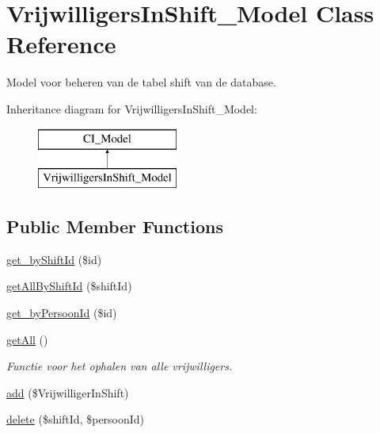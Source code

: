 \hypertarget{class_vrijwilligers_in_shift___model}{}\section{Vrijwilligers\+In\+Shift\+\_\+\+Model Class Reference}
\label{class_vrijwilligers_in_shift___model}


Model voor beheren van de tabel shift van de database.  


Inheritance diagram for Vrijwilligers\+In\+Shift\+\_\+\+Model\+:\begin{figure}[H]
\begin{center}
\leavevmode
\includegraphics[height=2.000000cm]{class_vrijwilligers_in_shift___model}
\end{center}
\end{figure}
\subsection*{Public Member Functions}
\begin{DoxyCompactItemize}
\item 
\mbox{\hyperlink{class_vrijwilligers_in_shift___model_ac7afbe51273364c55dd352b3c9554592}{get\+\_\+by\+Shift\+Id}} (\$id)
\item 
\mbox{\hyperlink{class_vrijwilligers_in_shift___model_a8a9b3e545063a3b69d118ac1109b3da4}{get\+All\+By\+Shift\+Id}} (\$shift\+Id)
\item 
\mbox{\hyperlink{class_vrijwilligers_in_shift___model_aae12e5673029c5081662fa51503c4413}{get\+\_\+by\+Persoon\+Id}} (\$id)
\item 
\mbox{\label{class_vrijwilligers_in_shift___model_a8323f4be7e1a03445c0b6c46ede8d35c}} 
\mbox{\hyperlink{class_vrijwilligers_in_shift___model_a8323f4be7e1a03445c0b6c46ede8d35c}{get\+All}} ()
\begin{DoxyCompactList}\small\item\em Functie voor het ophalen van alle vrijwilligers. \end{DoxyCompactList}\item 
\mbox{\hyperlink{class_vrijwilligers_in_shift___model_ace0abb83991ff90729515c3e86c0a3ac}{add}} (\$Vrijwilliger\+In\+Shift)
\item 
\mbox{\hyperlink{class_vrijwilligers_in_shift___model_a62d1d1920e3c5a73f117ad9293260d67}{delete}} (\$shift\+Id, \$persoon\+Id)
\end{DoxyCompactItemize}


